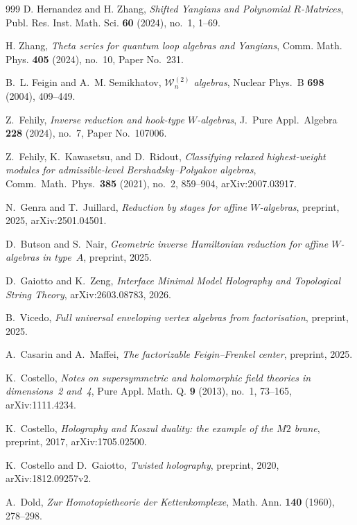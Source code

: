 \begin{thebibliography}{999}
D. Hernandez and H. Zhang, \emph{Shifted Yangians and Polynomial $R$-Matrices}, Publ. Res. Inst. Math. Sci. \textbf{60} (2024), no.~1, 1--69.

H. Zhang, \emph{Theta series for quantum loop algebras and Yangians}, Comm. Math. Phys. \textbf{405} (2024), no.~10, Paper No.~231.

B.~L. Feigin and A.~M. Semikhatov, \emph{$\mathcal W_n^{(2)}$ algebras}, Nuclear Phys.~B \textbf{698} (2004), 409--449.

Z.~Fehily, \emph{Inverse reduction and hook-type $W$-algebras}, J.~Pure Appl.\ Algebra \textbf{228} (2024), no.~7, Paper No.~107006.

Z.~Fehily, K.~Kawasetsu, and D.~Ridout, \emph{Classifying relaxed highest-weight modules for admissible-level Bershadsky--Polyakov algebras}, Comm.\ Math.\ Phys.\ \textbf{385} (2021), no.~2, 859--904, arXiv:2007.03917.

N.~Genra and T.~Juillard, \emph{Reduction by stages for affine $W$-algebras}, preprint, 2025, arXiv:2501.04501.

D.~Butson and S.~Nair, \emph{Geometric inverse Hamiltonian reduction for affine $W$-algebras in type~$A$}, preprint, 2025.

D.~Gaiotto and K.~Zeng, \emph{Interface Minimal Model Holography and Topological String Theory}, arXiv:2603.08783, 2026.

B.~Vicedo, \emph{Full universal enveloping vertex algebras from factorisation}, preprint, 2025.

A.~Casarin and A.~Maffei, \emph{The factorizable Feigin--Frenkel center}, preprint, 2025.

K.~Costello, \emph{Notes on supersymmetric and holomorphic field theories in dimensions~2 and~4}, Pure Appl. Math. Q. \textbf{9} (2013), no.~1, 73--165, arXiv:1111.4234.

K.~Costello, \emph{Holography and Koszul duality: the example of the $M2$ brane}, preprint, 2017, arXiv:1705.02500.

K.~Costello and D.~Gaiotto, \emph{Twisted holography}, preprint, 2020, arXiv:1812.09257v2.

A.~Dold, \emph{Zur Homotopietheorie der Kettenkomplexe}, Math. Ann. \textbf{140} (1960), 278--298.


\end{thebibliography}
